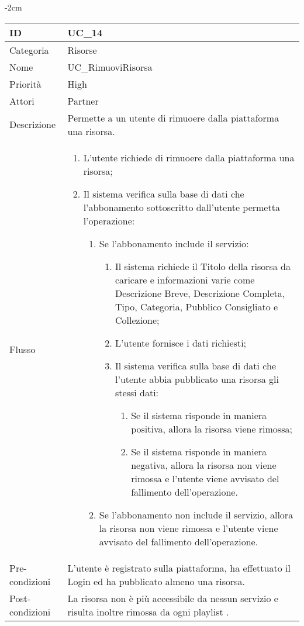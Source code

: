 \begin{center}
\begin{table}[bp]
    \centering
    \addtolength{\leftskip} {-2cm}
\begin{tabular}{ |p{2.6cm}|p{13cm}|  }
\hline
ID & UC\_14 \\\hline
Categoria & Risorse\\\hline
Nome & UC\_RimuoviRisorsa\\\hline
Priorità & High \\\hline
Attori &  Partner \\\hline
Descrizione & Permette a un utente di rimuoere dalla piattaforma una risorsa.\\\hline
Flusso &  	\vspace{-5mm} \begin{enumerate}
			\item L'utente richiede di rimuoere dalla piattaforma una risorsa;
			\item Il sistema verifica sulla base di dati che l'abbonamento sottoscritto dall'utente permetta l'operazione:
			\begin{enumerate}
				\item Se l'abbonamento include il servizio:
				\begin{enumerate}
					\item Il sistema richiede il Titolo della risorsa da caricare e informazioni varie come Descrizione Breve,  Descrizione Completa, Tipo, Categoria, Pubblico Consigliato e Collezione;
					\item L'utente fornisce i dati richiesti;
					\item Il sistema verifica sulla base di dati che l'utente abbia pubblicato una risorsa gli stessi dati:
					\begin{enumerate}
						\item Se il sistema risponde in maniera positiva, allora la risorsa viene rimossa;
						\item Se il sistema risponde in maniera negativa, allora  la risorsa non viene rimossa e l'utente viene avvisato del fallimento dell'operazione.
					\end{enumerate}
				\end{enumerate}
				\item Se l'abbonamento non include il servizio, allora la risorsa non viene rimossa e l'utente viene avvisato del fallimento dell'operazione.
			\end{enumerate}
		\end{enumerate}\\\hline
Pre-condizioni & L'utente è registrato sulla piattaforma, ha effettuato il Login ed ha pubblicato almeno una risorsa.\\\hline
Post-condizioni & La risorsa non è più accessibile da nessun servizio e risulta inoltre rimossa da ogni playlist .\\\hline
\end{tabular}
\label{table_use_case:14}\newline
\end{table}


\end{center}
